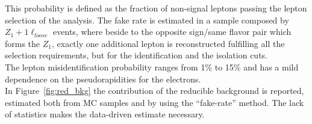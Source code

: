 This probability is defined as the fraction of non-signal leptons passing the lepton selection of the analysis.
The fake rate is estimated in a sample composed by $Z_1 + 1\ell _{loose}$ events, 
where beside to the opposite sign/same flavor pair which forms the $Z_{1}$, 
exactly one additional lepton is reconstructed fulfilling all the selection requirements, 
but for the identification and the isolation cuts.\\
The lepton misidentification probability ranges from 1\% to 15\% and has a mild dependence on the pseudorapidities for the 
electrons.\\
In Figure~\ref{fig:red_bkg} the contribution of the reducible background is reported, estimated both from MC samples and by 
using the ``fake-rate'' method. The lack of statistics makes the data-driven estimate necessary.

